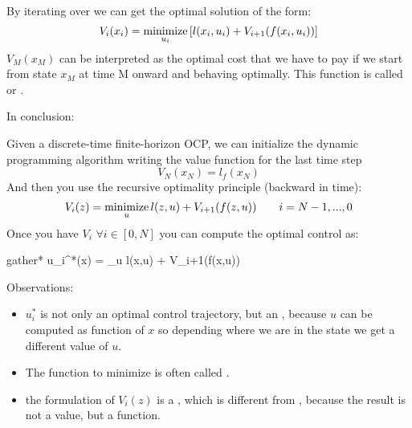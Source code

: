 By iterating over we can get the optimal solution of the form:
\[V_i(x_i) = \operatorname*{minimize}_{u_i}\left[l(x_i,u_i) + V_{i+1}(f(x_i,u_i))\right]\]
$V_M(x_M)$ can be interpreted as the optimal cost that we have to pay if we start from state $x_M$ at time M onward and behaving optimally. This function is called  or .

In conclusion:

Given a discrete-time finite-horizon OCP, we can initialize the dynamic programming algorithm writing the value function for the last time step
\[V_N(x_N) = l_f(x_N)\]
And then you use the recursive optimality principle (backward in time):
\[V_i(z) = \operatorname*{minimize}_{u} l(z, u) + V_{i+1}(f(z,u))\qquad i = N-1,...,0\]
Once you have $V_i \,\,\forall i \in [0, N]$ you can compute the optimal control as:
\begin{empheq}[box=%
	\fbox]{gather*}
		u_i^*(x) = \argmin_u  l(x,u) + V_{i+1}(f(x,u))
	\end{empheq}



Observations:
\begin{itemize}
\item $u_i^*$ is not only an optimal control trajectory, but an , because $u$ can be computed as function of $x$ so depending where we are in the state we get a different value of $u$.
\item The function to minimize is often called .
\item the formulation of $V_i(z)$ is a , which is different from , because the result is not a value, but a function.
\end{itemize}

